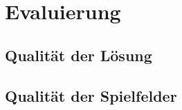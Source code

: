 \chapter{Evaluierung}
\label{ch:S6_Evaluierung}

\section{Qualität der Lösung}

\section{Qualität der Spielfelder}


